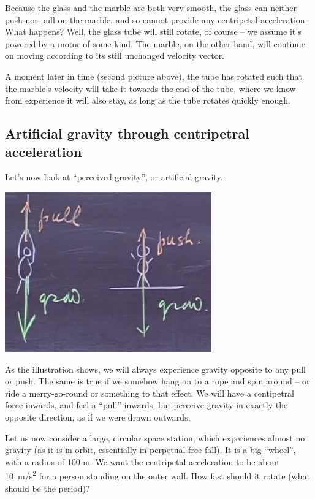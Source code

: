 \documentclass[12pt,a4paper]{report}
\begin{document}
Because the glass and the marble are both very smooth, the glass can neither push nor pull on the marble, and so cannot provide any centripetal acceleration. What happens? Well, the glass tube will still rotate, of course -- we assume it's powered by a motor of some kind. The marble, on the other hand, will continue on moving according to its still unchanged velocity vector.

A moment later in time (second picture above), the tube has rotated such that the marble's velocity will take it towards the end of the tube, where we know from experience it will also stay, as long as the tube rotates quickly enough.

\subsection{Artificial gravity through centripetral acceleration}

Let's now look at ``perceived gravity'', or artificial gravity.

\begin{center}
\includegraphics[scale=0.6]{Graphics/lec5_gravity}
\end{center}

As the illustration shows, we will always experience gravity opposite to any pull or push. The same is true if we somehow hang on to a rope and spin around -- or ride a merry-go-round or something to that effect. We will have a centipetral force inwards, and feel a ``pull'' inwards, but perceive gravity in exactly the opposite direction, as if we were drawn outwards.

Let us now consider a large, circular space station, which experiences almost no gravity (as it is in orbit, essentially in perpetual free fall). It is a big ``wheel'', with a radius of 100 m. We want the centripetal acceleration to be about \SI{10}{m/s^2} for a person standing on the outer wall. How fast should it rotate (what should be the period)?
\end{document}
